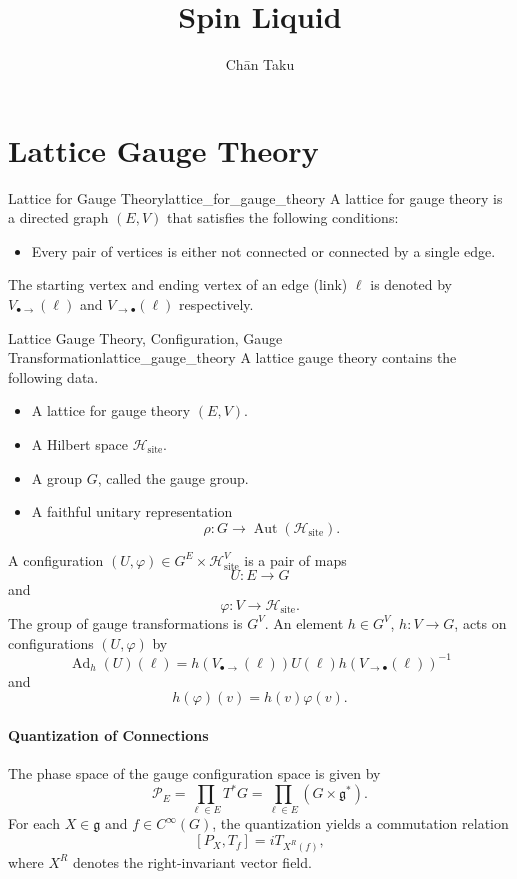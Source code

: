 \documentclass{article}
\title{Spin Liquid}
\author{Ch\=an Taku}
\begin{document}
\maketitle

\section{Lattice Gauge Theory}

\begin{definition}{Lattice for Gauge Theory}{lattice_for_gauge_theory}
    A lattice for gauge theory is a directed graph $(E,V)$ that satisfies the following conditions:
    \begin{itemize}
        \item Every pair of vertices is either not connected or connected by a single edge.
    \end{itemize}
    The starting vertex and ending vertex of an edge (link) $\ell$ is denoted by $V_{\bullet\rightarrow}(\ell)$ and $V_{\rightarrow\bullet}(\ell)$ respectively.
\end{definition}

\begin{definition}{Lattice Gauge Theory, Configuration, Gauge Transformation}{lattice_gauge_theory}
    A lattice gauge theory contains the following data.
    \begin{itemize}
        \item A lattice for gauge theory $(E,V)$.
        \item A Hilbert space $\mathcal{H}_{\mathrm{site}}$.
        \item A group $G$, called the gauge group.
        \item A faithful unitary representation
        \[ \rho: G \rightarrow \operatorname{Aut}(\mathcal{H}_{\mathrm{site}}). \]
    \end{itemize}
    A configuration $(U,\varphi)\in G^E \times \mathcal{H}_{\mathrm{site}}^V$ is a pair of maps
    \[ U: E \rightarrow G \]
    and
    \[ \varphi: V \rightarrow \mathcal{H}_{\mathrm{site}}. \]
    The group of gauge transformations is $G^V$.
    An element $h\in G^V$, $h: V\rightarrow G$, acts on configurations $(U,\varphi)$ by
    \[ \operatorname{Ad}_h(U)(\ell) = h(V_{\bullet\rightarrow}(\ell)) U(\ell) h(V_{\rightarrow\bullet}(\ell))^{-1} \]
    and
    \[ h(\varphi)(v) = h(v)\varphi(v). \]
\end{definition}

\paragraph*{Quantization of Connections}
The phase space of the gauge configuration space is given by
\[ \mathscr{P}_E = \prod_{\ell \in E} T^* G = \prod_{\ell\in E} (G\times \mathfrak{g}^*). \]
For each $X\in \mathfrak{g}$ and $f\in C^\infty(G)$, the quantization yields a commutation relation
\[ [P_X, T_f] = i T_{X^R(f)}, \]
where $X^R$ denotes the right-invariant vector field.
\end{document}
